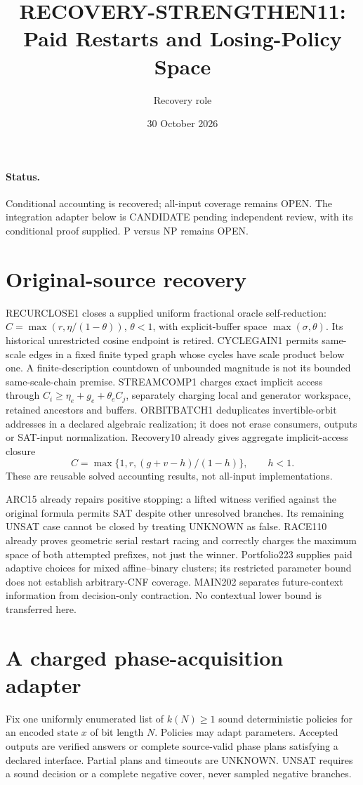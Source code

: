\documentclass[11pt]{article}
\title{RECOVERY-STRENGTHEN11: Paid Restarts and Losing-Policy Space}
\author{Recovery role}\date{30 October 2026}
\begin{document}
\sloppy\maketitle
\paragraph{Status.}
Conditional accounting is recovered; all-input coverage remains OPEN.
The integration adapter below is CANDIDATE pending independent review,
with its conditional proof supplied. P versus NP remains OPEN.

\section{Original-source recovery}
RECURCLOSE1 closes a supplied uniform fractional oracle self-reduction:
$C=\max(r,\eta/(1-\theta))$, $\theta<1$, with explicit-buffer space
$\max(\sigma,\theta)$. Its historical unrestricted cosine endpoint is retired.
CYCLEGAIN1 permits same-scale edges in a fixed finite typed graph whose
cycles have scale product below one. A finite-description countdown of
unbounded magnitude is not its bounded same-scale-chain premise.
STREAMCOMP1 charges exact implicit access through
$C_i\ge\eta_e+g_e+\theta_e C_j$, separately charging local and generator
workspace, retained ancestors and buffers.
ORBITBATCH1 deduplicates invertible-orbit addresses in a declared algebraic
realization; it does not erase consumers, outputs or SAT-input normalization.
Recovery10 already gives aggregate implicit-access closure
\[
 C=\max\{1,r,(g+v-h)/(1-h)\},\qquad h<1.
\]
These are reusable solved accounting results, not all-input implementations.

ARC15 already repairs positive stopping: a lifted witness verified against
the original formula permits SAT despite other unresolved branches. Its
remaining UNSAT case cannot be closed by treating UNKNOWN as false.
RACE110 already proves geometric serial restart racing and correctly charges
the maximum space of both attempted prefixes, not just the winner.
Portfolio223 supplies paid adaptive choices for mixed affine--binary
clusters; its restricted parameter bound does not establish arbitrary-CNF
coverage. MAIN202 separates future-context information from decision-only
contraction. No contextual lower bound is transferred here.

\section{A charged phase-acquisition adapter}
Fix one uniformly enumerated list of $k(N)\ge1$ sound deterministic policies
for an encoded state $x$ of bit length $N$. Policies may adapt parameters.
Accepted outputs are verified answers or complete source-valid phase plans
satisfying a declared interface. Partial plans and timeouts are UNKNOWN.
UNSAT requires a sound decision or a complete negative cover, never sampled
negative branches.
\end{document}

